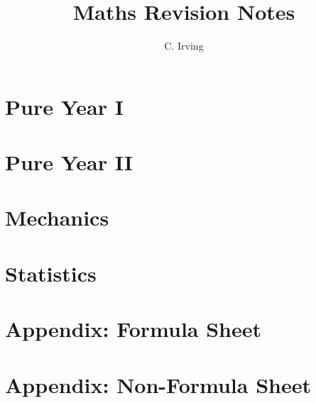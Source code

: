 \documentclass{book}
\title{\Huge Maths Revision Notes}
\author{C. Irving}
\date{}
\begin{document}
\maketitle

\tableofcontents

\mainmatter

\chapter{Pure Year I} \label{ch:pure_i}
    

\chapter{Pure Year II} \label{ch:pure_ii}
    

\chapter{Mechanics} \label{ch:mechanics}
    

\chapter{Statistics} \label{ch:statistics}
    

\appendix
\chapter{Appendix: Formula Sheet} \label{ch:formula_sheet}
    

\chapter{Appendix: Non-Formula Sheet} \label{ch:non_formula_sheet}
    

\printnoidxglossaries
\end{document}
